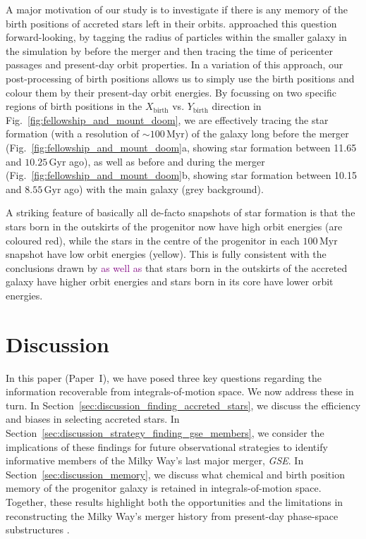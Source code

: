\documentclass[fleqn,usenatbib]{mnras}
\newcommand{\changed}[1]{{\textcolor{purple}{#1}}}
\begin{document}
A major motivation of our study is to investigate if there is any memory of the birth positions of accreted stars left in their orbits. \citet{Skuladottir2025} approached this question forward-looking, by tagging the radius of particles within the smaller galaxy in the simulation by \citet{Mori2024} before the merger and then tracing the time of pericenter passages and present-day orbit properties. In a variation of this approach, our post-processing of birth positions allows us to simply use the birth positions and colour them by their present-day orbit energies. By focussing on two specific regions of birth positions in the $X_\mathrm{birth}$ vs. $Y_\mathrm{birth}$ direction in Fig.~\ref{fig:fellowship_and_mount_doom}, we are effectively tracing the star formation (with a resolution of $\sim 100\,\mathrm{Myr}$) of the galaxy long before the merger (Fig.~\ref{fig:fellowship_and_mount_doom}a, showing star formation between 11.65 and $10.25\,\mathrm{Gyr}$ ago), as well as before and during the merger (Fig.~\ref{fig:fellowship_and_mount_doom}b, showing star formation between 10.15 and $8.55\,\mathrm{Gyr}$ ago) with the main galaxy (grey background).

A striking feature of basically all de-facto snapshots of star formation is that the stars born in the outskirts of the progenitor now have high orbit energies (are coloured red), while the stars in the centre of the progenitor in each $100\,\mathrm{Myr}$ snapshot have low orbit energies (yellow). This is fully consistent with the conclusions drawn by \citet{Skuladottir2025} \changed{as well as \citet{Khoperskov2023b}} that stars born in the outskirts of the accreted galaxy have higher orbit energies and stars born in its core have lower orbit energies.

\section{Discussion}
\label{sec:discussion}

In this paper (Paper~I), we have posed three key questions regarding the information recoverable from integrals-of-motion space. We now address these in turn. In Section~\ref{sec:discussion_finding_accreted_stars}, we discuss the efficiency and biases in selecting accreted stars. In Section~\ref{sec:discussion_strategy_finding_gse_members}, we consider the implications of these findings for future observational strategies to identify informative members of the Milky Way’s last major merger, \textit{GSE}. In Section~\ref{sec:discussion_memory}, we discuss what chemical and birth position memory of the progenitor galaxy is retained in integrals-of-motion space. Together, these results highlight both the opportunities and the limitations in reconstructing the Milky Way’s merger history from present-day phase-space substructures \changed{\citep[see also][]{Thomas2025}}.
\end{document}
